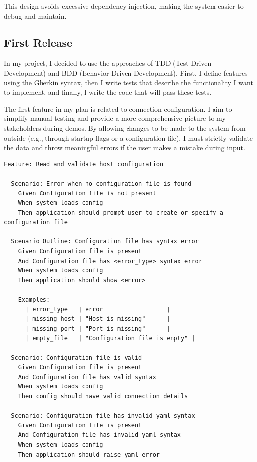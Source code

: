 \documentclass[10pt , a4paper]{report}
\begin{document}
This design avoids excessive dependency injection, making the system easier to debug and maintain.

\newpage
\subsection{First Release}

In my project, I decided to use the approaches of TDD (Test-Driven Development) and BDD (Behavior-Driven Development). First, I define features using the Gherkin syntax, then I write tests that describe the functionality I want to implement, and finally, I write the code that will pass these tests. 

The first feature in my plan is related to connection configuration. I aim to simplify manual testing and provide a more comprehensive picture to my stakeholders during demos. By allowing changes to be made to the system from outside (e.g., through startup flags or a configuration file), I must strictly validate the data and throw meaningful errors if the user makes a mistake during input.

\begin{listing}[htbp]
  \begin{verbatim}
Feature: Read and validate host configuration

  Scenario: Error when no configuration file is found
    Given Configuration file is not present
    When system loads config  
    Then application should prompt user to create or specify a configuration file
  
  Scenario Outline: Configuration file has syntax error
    Given Configuration file is present
    And Configuration file has <error_type> syntax error
    When system loads config
    Then application should show <error>

    Examples:
      | error_type   | error                  |
      | missing_host | "Host is missing"      |
      | missing_port | "Port is missing"      |
      | empty_file   | "Configuration file is empty" |

  Scenario: Configuration file is valid
    Given Configuration file is present
    And Configuration file has valid syntax
    When system loads config
    Then config should have valid connection details

  Scenario: Configuration file has invalid yaml syntax
    Given Configuration file is present
    And Configuration file has invalid yaml syntax
    When system loads config
    Then application should raise yaml error
  \end{verbatim}
\end{listing}
\end{document}
